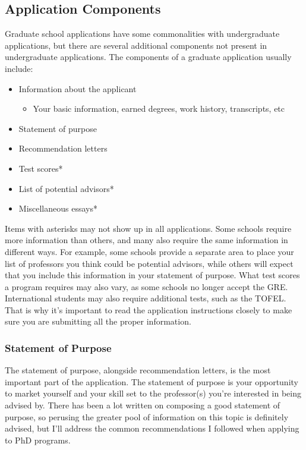 \documentclass[12pt]{article}
\begin{document}
\subsection{Application Components}

Graduate school applications have some commonalities with undergraduate applications, but there are several additional components not present in undergraduate applications. The components of a graduate application usually include:

\begin{itemize}
    \item Information about the applicant
    \begin{itemize}
        \item Your basic information, earned degrees, work history, transcripts, etc 
    \end{itemize}
    \item Statement of purpose
    \item Recommendation letters
    \item Test scores*
    \item List of potential advisors*
    \item Miscellaneous essays*
\end{itemize}

Items with asterisks may not show up in all applications. Some schools require more information than others, and many also require the same information in different ways. For example, some schools provide a separate area to place your list of professors you think could be potential advisors, while others will expect that you include this information in your statement of purpose. What test scores a program requires may also vary, as some schools no longer accept the GRE. International students may also require additional tests, such as the TOFEL. That is why it's important to read the application instructions closely to make sure you are submitting all the proper information.

\subsubsection{Statement of Purpose}

The statement of purpose, alongside recommendation letters, is the most important part of the application. The statement of purpose is your opportunity to market yourself and your skill set to the professor(s) you're interested in being advised by. There has been a lot written on composing a good statement of purpose, so perusing the greater pool of information on this topic is definitely advised, but I'll address the common recommendations I followed when applying to PhD programs.
\end{document}
